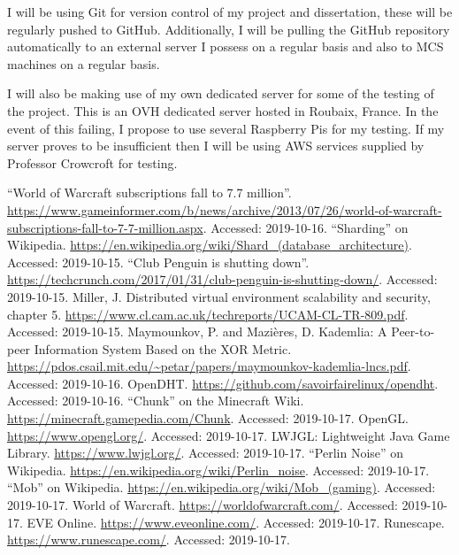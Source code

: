 \documentclass[11pt,a4paper]{article}
\begin{document}
	I will be using Git for version control of my project and dissertation, these will be regularly pushed to GitHub. Additionally, I will be pulling the GitHub repository automatically to an external server I possess on a regular basis and also to MCS machines on a regular basis.
	
	I will also be making use of my own dedicated server for some of the testing of the project. This is an OVH dedicated server hosted in Roubaix, France. In the event of this failing, I propose to use several Raspberry Pis for my testing. If my server proves to be insufficient then I will be using AWS services supplied by Professor Crowcroft for testing.
	
	\begin{thebibliography}{9}
		 ``World of Warcraft subscriptions fall to 7.7 million''. \url{https://www.gameinformer.com/b/news/archive/2013/07/26/world-of-warcraft-subscriptions-fall-to-7-7-million.aspx}. Accessed: 2019-10-16.
		 ``Sharding'' on Wikipedia. \url{https://en.wikipedia.org/wiki/Shard_(database_architecture)}. Accessed: 2019-10-15.
		 ``Club Penguin is shutting down''. \url{https://techcrunch.com/2017/01/31/club-penguin-is-shutting-down/}. Accessed: 2019-10-15.
		 Miller, J. Distributed virtual environment
		scalability and security, chapter 5. \url{https://www.cl.cam.ac.uk/techreports/UCAM-CL-TR-809.pdf}. Accessed: 2019-10-15.
		 Maymounkov, P. and Mazières, D. Kademlia: A Peer-to-peer Information System Based on the XOR Metric. \url{https://pdos.csail.mit.edu/~petar/papers/maymounkov-kademlia-lncs.pdf}. Accessed: 2019-10-16.
		 OpenDHT. \url{https://github.com/savoirfairelinux/opendht}. Accessed: 2019-10-16.
		 ``Chunk'' on the Minecraft Wiki. \url{https://minecraft.gamepedia.com/Chunk}. Accessed: 2019-10-17.
		 OpenGL. \url{https://www.opengl.org/}. Accessed: 2019-10-17.
		 LWJGL: Lightweight Java Game Library. \url{https://www.lwjgl.org/}. Accessed: 2019-10-17.
		 ``Perlin Noise'' on Wikipedia. \url{https://en.wikipedia.org/wiki/Perlin_noise}. Accessed: 2019-10-17.
		 ``Mob'' on Wikipedia. \url{https://en.wikipedia.org/wiki/Mob_(gaming)}. Accessed: 2019-10-17.
		 World of Warcraft. \url{https://worldofwarcraft.com/}. Accessed: 2019-10-17.
		 EVE Online. \url{https://www.eveonline.com/}. Accessed: 2019-10-17.
		 Runescape. \url{https://www.runescape.com/}. Accessed: 2019-10-17.
	\end{thebibliography}
\end{document}
